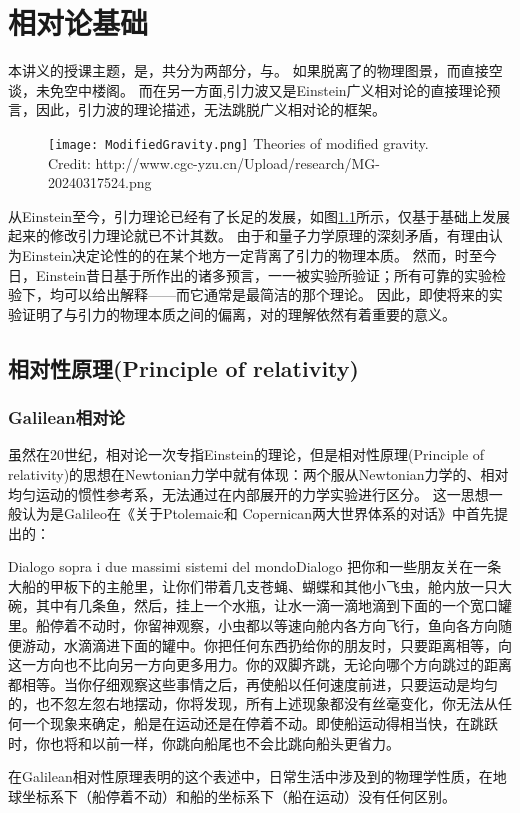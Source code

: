 \chapter{相对论基础}

本讲义的授课主题，是\gw\DA，共分为两部分，\emph{\gw}与\emph{\DA}。
如果脱离了\gw 的物理图景，而直接空谈\DA，未免空中楼阁。
而在另一方面,引力波又是Einstein广义相对论的直接理论预言，因此，引力波的理论描述，无法跳脱广义相对论的框架。

\begin{figure}[htp]
\centering
\texttt{[image: ModifiedGravity.png]}
  {Theories of modified gravity. Credit: http://www.cgc-yzu.cn/Upload/research/MG-20240317524.png}
\label{fig:ModGrav}
\end{figure}

从Einstein至今，引力理论已经有了长足的发展，如图\ref{fig:ModGrav}所示，仅基于\GR 基础上发展起来的修改引力理论就已不计其数。
由于和量子力学原理的深刻矛盾，有理由认为Einstein决定论性的的\GR 在某个地方一定背离了引力的物理本质。
然而，时至今日，Einstein昔日基于\GR 所作出的诸多预言，一一被实验所验证；所有可靠的实验检验下，\GR 均可以给出解释——而它通常是最简洁的那个理论。
因此，即使将来的实验证明了\GR 与引力的物理本质之间的偏离，对\GR 的理解依然有着重要的意义。

\section{相对性原理(Principle of relativity)}

\subsection{Galilean相对论}
虽然在20世纪，相对论一次专指Einstein的理论，但是相对性原理(Principle of relativity)的思想在Newtonian力学中就有体现：两个服从Newtonian力学的、相对均匀运动的惯性参考系，无法通过在内部展开的力学实验进行区分。
这一思想一般认为是Galileo在《关于Ptolemaic和 Copernican两大世界体系的对话》中首先提出的\cite{Fang:2012blog}：
\begin{myprop}{Dialogo sopra i due massimi sistemi del mondo}{Dialogo}
把你和一些朋友关在一条大船的甲板下的主舱里，让你们带着几支苍蝇、蝴蝶和其他小飞虫，舱内放一只大碗，其中有几条鱼，然后，挂上一个水瓶，让水一滴一滴地滴到下面的一个宽口罐里。船停着不动时，你留神观察，小虫都以等速向舱内各方向飞行，鱼向各方向随便游动，水滴滴进下面的罐中。你把任何东西扔给你的朋友时，只要距离相等，向这一方向也不比向另一方向更多用力。你的双脚齐跳，无论向哪个方向跳过的距离都相等。当你仔细观察这些事情之后，再使船以任何速度前进，只要运动是均匀的，也不忽左忽右地摆动，你将发现，所有上述现象都没有丝毫变化，你无法从任何一个现象来确定，船是在运动还是在停着不动。即使船运动得相当快，在跳跃时，你也将和以前一样，你跳向船尾也不会比跳向船头更省力。
\end{myprop}
在Galilean相对性原理表明的这个表述中，日常生活中涉及到的物理学性质，在地球坐标系下（船停着不动）和船的坐标系下（船在运动）没有任何区别。

